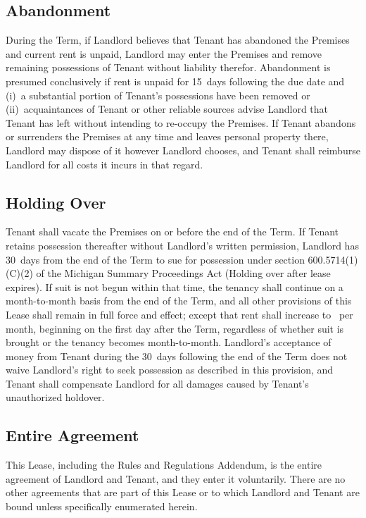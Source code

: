 \documentclass{article}
\begin{document}
\subsection{Abandonment}
During the Term, if Landlord believes that Tenant has abandoned the Premises and
current rent is unpaid, Landlord may enter the Premises and remove remaining
possessions of Tenant without liability therefor. Abandonment is presumed
conclusively if rent is unpaid for 15~days following the due date and (i)~a
substantial portion of Tenant’s possessions have been removed or
(ii)~acquaintances of Tenant or other reliable sources advise Landlord that
Tenant has left without intending to re-occupy the Premises. If Tenant abandons
or surrenders the Premises at any time and leaves personal property there,
Landlord may dispose of it however Landlord chooses, and Tenant shall reimburse
Landlord for all costs it incurs in that regard.

\subsection{Holding Over}
Tenant shall vacate the Premises on or before the end of the Term. If Tenant
retains possession thereafter without Landlord’s written permission, Landlord
has 30~days from the end of the Term to sue for possession under section
600.5714(1)(C)(2) of the Michigan Summary Proceedings Act (Holding over after
lease expires). If suit is not begun within that time, the tenancy shall
continue on a month-to-month basis from the end of the Term, and all other
provisions of this Lease shall remain in full force and effect; except that rent
shall increase to \monthlyRentDuringHoldover\ per month, beginning on the first
day after the Term, regardless of whether suit is brought or the tenancy becomes
month-to-month. Landlord’s acceptance of money from Tenant during the 30~days
following the end of the Term does not waive Landlord’s right to seek possession
as described in this provision, and Tenant shall compensate Landlord for all
damages caused by Tenant’s unauthorized holdover.

\subsection{Entire Agreement}\label{Entire Agreement}
This Lease, including the Rules and Regulations Addendum, is the entire
agreement of Landlord and Tenant, and they enter it voluntarily. There are no
other agreements that are part of this Lease or to which Landlord and Tenant are
bound unless specifically enumerated herein.
\end{document}
